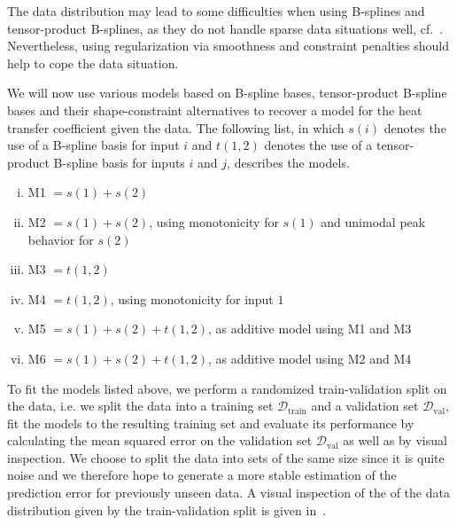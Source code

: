 The data distribution may lead to some difficulties when using B-splines and tensor-product B-splines, as they do not handle sparse data situations well, cf.~. Nevertheless, using regularization via smoothness and constraint penalties should help to cope the data situation. 

We will now use various models based on B-spline bases, tensor-product B-spline bases and their shape-constraint alternatives to recover a model for the heat transfer coefficient given the data. The following list, in which $s(i)$ denotes the use of a B-spline basis for input $i$ and $t(1,2)$ denotes the use of a tensor-product B-spline basis for inputs $i$ and $j$, describes the models.

\begin{enumerate}[(i)]
	\item M1 $= s(1) + s(2)$
	\item M2 $= s(1) + s(2)$, using monotonicity for $s(1)$ and unimodal peak behavior for $s(2)$
	\item M3 $= t(1,2)$
	\item M4 $= t(1,2)$, using monotonicity for input $1$
	\item M5 $= s(1) + s(2) + t(1,2)$, as additive model using M1 and M3
	\item M6 $= s(1) +s(2) + t(1,2)$, as additive model using M2 and M4
\end{enumerate}
%
To fit the models listed above, we perform a randomized train-validation split on the data, i.e. we split the data into a training set $\mathcal{D}_{\text{train}}$ and a validation set $\mathcal{D}_{\text{val}}$, fit the models to the resulting training set and evaluate its performance by calculating the mean squared error on the validation set $\mathcal{D}_{\text{val}}$ as well as by visual inspection. We choose to split the data into sets of the same size since it is quite noise and we therefore hope to generate a more stable estimation of the prediction error for previously unseen data. A visual inspection of the of the data distribution given by the train-validation split is given in~.

